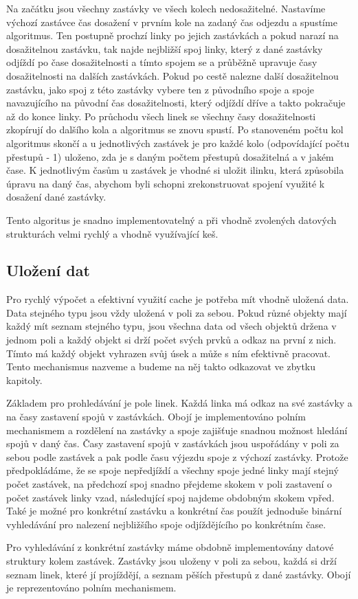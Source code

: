 Na začátku jsou všechny zastávky ve všech kolech nedosažitelné. Nastavíme
výchozí zastávce čas dosažení v prvním kole na zadaný čas odjezdu a spustíme
algoritmus. Ten postupně prochzí linky po jejich zastávkách a pokud narazí na
dosažitelnou zastávku, tak najde nejbližší spoj linky, který z dané zastávky
odjíždí po čase dosažitelnosti a tímto spojem se  a průběžně upravuje
časy dosažitelnosti na dalších zastávkách. Pokud po cestě nalezne další
dosažitelnou zastávku, jako spoj z této zastávky vybere ten z původního spoje a
spoje navazujícího na původní čas dosažitelnosti, který odjíždí dříve a takto
pokračuje až do konce linky. Po průchodu všech linek se všechny časy
dosažitelnosti zkopírují do dalšího kola a algoritmus se znovu spustí. Po
stanoveném počtu kol algoritmus skončí a u jednotlivých zastávek je pro každé
kolo (odpovídající počtu přestupů - 1) uloženo, zda je s daným počtem přestupů
dosažitelná a v jakém čase. K jednotlivým časům u zastávek je vhodné si uložit
ilinku, která způsobila úpravu na daný čas, abychom byli schopni zrekonstruovat
spojení využité k dosažení dané zastávky. 

Tento algoritus je snadno implementovatelný a při vhodně zvolených datových
strukturách velmi rychlý a vhodně využívající keš. 

\subsection{Uložení dat}
Pro rychlý výpočet a efektivní využití cache je potřeba mít vhodně uložená data.
Data stejného typu jsou vždy uložená v poli za sebou. Pokud různé objekty mají
každý mít seznam stejného typu, jsou všechna data od všech objektů držena v
jednom poli a každý objekt si drží počet svých prvků a odkaz na první z nich.
Tímto má každý objekt vyhrazen svůj úsek a může s ním efektivně pracovat. Tento
mechanismus nazveme  a budeme na něj takto odkazovat ve
zbytku kapitoly.

Základem pro prohledávání je pole linek. Každá linka má odkaz na své zastávky a
na časy zastavení spojů v zastávkách. Obojí je implementováno polním mechanismem
a rozdělení na zastávky a spoje zajišťuje snadnou možnost hledání spojů v daný
čas. Časy zastavení spojů v zastávkách jsou uspořádány v poli za sebou podle
zastávek a pak podle času výjezdu spoje z výchozí zastávky. Protože
předpokládáme, že se spoje nepředjíždí a všechny spoje jedné linky mají stejný
počet zastávek, na předchozí spoj snadno přejdeme skokem v poli zastavení o
počet zastávek linky vzad, následující spoj najdeme obdobným skokem vpřed. Také
je možné pro konkrétní zastávku a konkrétní čas použít jednoduše binární
vyhledávání pro nalezení nejbližšího spoje odjíždějícího po konkrétním čase. 

Pro vyhledávání z konkrétní zastávky máme obdobně implementovány datové
struktury kolem zastávek. Zastávky jsou uloženy v poli za sebou, každá si drží
seznam linek, které jí projíždějí, a seznam pěších přestupů z dané zastávky. 
Obojí je reprezentováno polním mechanismem.   

